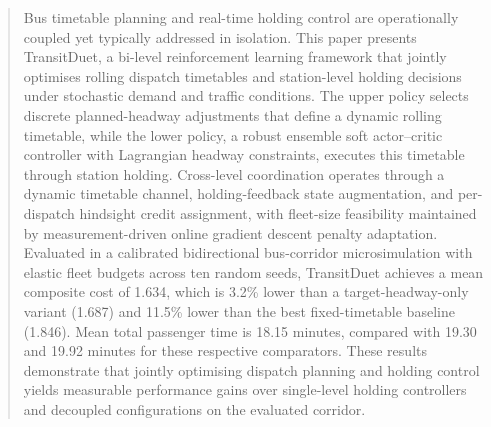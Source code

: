 \begin{abstract}
Bus timetable planning and real-time holding control are operationally coupled yet typically addressed in isolation. This paper presents TransitDuet, a bi-level reinforcement learning framework that jointly optimises rolling dispatch timetables and station-level holding decisions under stochastic demand and traffic conditions. The upper policy selects discrete planned-headway adjustments that define a dynamic rolling timetable, while the lower policy, a robust ensemble soft actor--critic controller with Lagrangian headway constraints, executes this timetable through station holding. Cross-level coordination operates through a dynamic timetable channel, holding-feedback state augmentation, and per-dispatch hindsight credit assignment, with fleet-size feasibility maintained by measurement-driven online gradient descent penalty adaptation. Evaluated in a calibrated bidirectional bus-corridor microsimulation with elastic fleet budgets across ten random seeds, TransitDuet achieves a mean composite cost of 1.634, which is 3.2\% lower than a target-headway-only variant (1.687) and 11.5\% lower than the best fixed-timetable baseline (1.846). Mean total passenger time is 18.15 minutes, compared with 19.30 and 19.92 minutes for these respective comparators. These results demonstrate that jointly optimising dispatch planning and holding control yields measurable performance gains over single-level holding controllers and decoupled configurations on the evaluated corridor.
\end{abstract}
